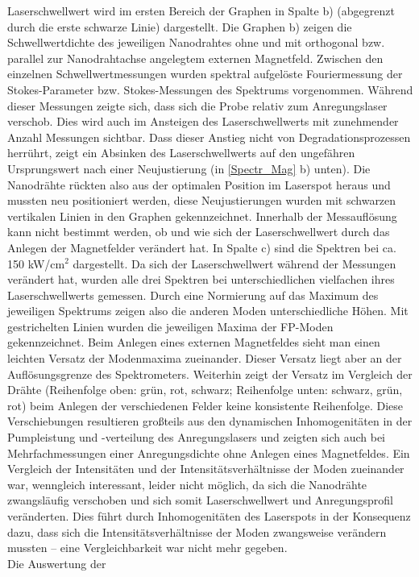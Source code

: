 Laserschwellwert wird im ersten Bereich der Graphen in Spalte b) (abgegrenzt
durch die erste schwarze Linie) dargestellt. Die Graphen b) zeigen die
Schwellwertdichte des jeweiligen Nanodrahtes ohne und mit orthogonal bzw.
parallel zur Nanodrahtachse angelegtem externen Magnetfeld. Zwischen den
einzelnen Schwellwertmessungen wurden spektral aufgelöste Fouriermessung der
Stokes-Parameter bzw. Stokes-Messungen des Spektrums vorgenommen. Während dieser
Messungen zeigte sich, dass sich die Probe relativ zum Anregungslaser verschob.
Dies wird auch im Ansteigen des Laserschwellwerts mit zunehmender Anzahl
Messungen sichtbar. Dass dieser Anstieg nicht von Degradationsprozessen
herrührt, zeigt ein Absinken des Laserschwellwerts auf den ungefähren
Ursprungswert nach einer Neujustierung (in \autoref{Spectr_Mag} b) unten). Die
Nanodrähte rückten also aus der optimalen Position im Laserspot heraus und
mussten neu positioniert werden, diese Neujustierungen wurden mit schwarzen
vertikalen Linien in den Graphen gekennzeichnet. Innerhalb der Messauflösung
kann nicht bestimmt werden, ob und wie sich der Laserschwellwert durch das
Anlegen der Magnetfelder verändert hat. In Spalte c) sind die Spektren bei ca.
150 kW/cm$^{2}$ dargestellt. Da sich der Laserschwellwert während der Messungen
verändert hat, wurden alle drei Spektren bei unterschiedlichen vielfachen ihres
Laserschwellwerts gemessen. Durch eine Normierung auf das Maximum des jeweiligen
Spektrums zeigen also die anderen Moden unterschiedliche Höhen. Mit
gestrichelten Linien wurden die jeweiligen Maxima der FP-Moden gekennzeichnet.
Beim Anlegen eines externen Magnetfeldes sieht man einen leichten Versatz der
Modenmaxima zueinander. Dieser Versatz liegt aber an der Auflösungsgrenze des
Spektrometers. Weiterhin zeigt der Versatz im Vergleich der Drähte (Reihenfolge
oben: grün, rot, schwarz; Reihenfolge unten: schwarz, grün, rot) beim Anlegen
der verschiedenen Felder keine konsistente Reihenfolge. Diese Verschiebungen
resultieren großteils aus den dynamischen Inhomogenitäten in der Pumpleistung
und -verteilung des Anregungslasers und zeigten sich auch bei Mehrfachmessungen
einer Anregungsdichte ohne Anlegen eines Magnetfeldes. Ein Vergleich der
Intensitäten und der Intensitätsverhältnisse der Moden zueinander war,
wenngleich interessant, leider nicht möglich, da sich die Nanodrähte
zwangsläufig verschoben und sich somit Laserschwellwert und Anregungsprofil
veränderten. Dies führt durch Inhomogenitäten des Laserspots in der Konsequenz
dazu, dass sich die Intensitätsverhältnisse der Moden zwangsweise verändern
mussten – eine Vergleichbarkeit war nicht mehr gegeben. \\ Die Auswertung der
